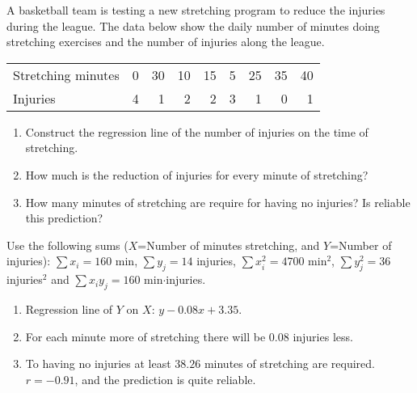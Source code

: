{A basketball team is testing a new stretching program to reduce the injuries during the league.
The data below show the daily number of minutes doing stretching exercises and the number of injuries along the league.
\begin{center}
\begin{tabular}{lrrrrrrrr}
\toprule
Stretching minutes & 0 & 30 & 10 & 15 & 5 & 25 & 35 & 40\\
Injuries & 4 & 1 & 2 & 2 & 3 & 1 & 0 & 1\\
\bottomrule
\end{tabular}
\end{center}
\begin{enumerate}
\item Construct the regression line of the number of injuries on the time of stretching.
\item How much is the reduction of injuries for every minute of stretching?
\item How many minutes of stretching are require for having no injuries? Is reliable this prediction?
\end{enumerate}

Use the following sums ($X$=Number of minutes stretching, and $Y$=Number of injuries):
$\sum x_i = 160$ min, $\sum y_j=14$ injuries, $\sum x_i^2= 4700$ min$^2$, $\sum y_j^2=36$ injuries$^2$ and $\sum
x_iy_j=160$  min$\cdot$injuries.
}
{
\begin{enumerate}
\item Regression line of $Y$ on $X$: $y-0.08x+3.35$.
\item For each minute more of stretching there will be $0.08$ injuries less.
\item To having no injuries at least $38.26$ minutes of stretching are required. $r=-0.91$, and the prediction is quite reliable.
\end{enumerate}
}
